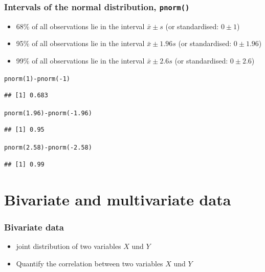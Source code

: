\documentclass[extsize,handout,10pt]{beamer}\usepackage[]{graphicx}\usepackage[]{color}
\makeatletter
\newcommand{\hlnum}[1]{\textcolor[rgb]{0.502,0.086,1}{#1}}%
\newcommand{\hlopt}[1]{\textcolor[rgb]{0.251,0.251,0.251}{#1}}%
\newcommand{\hlstd}[1]{\textcolor[rgb]{0.251,0.251,0.251}{#1}}%
\newcommand{\hlkwd}[1]{\textcolor[rgb]{0.69,0.188,0.941}{#1}}%
\newenvironment{kframe}{%
 \def\at@end@of@kframe{}%
 \ifinner\ifhmode%
  \def\at@end@of@kframe{\end{minipage}}%
  \begin{minipage}{\columnwidth}%
 \fi\fi%
 \def\FrameCommand##1{\hskip\@totalleftmargin \hskip-\fboxsep
 \colorbox{shadecolor}{##1}\hskip-\fboxsep
     \hskip-\linewidth \hskip-\@totalleftmargin \hskip\columnwidth}%
 \MakeFramed {\advance\hsize-\width
   \@totalleftmargin\z@ \linewidth\hsize
   \@setminipage}}%
 {\par\unskip\endMakeFramed%
 \at@end@of@kframe}
\newenvironment{knitrout}{}{} %
\makeatother
\begin{document}
\scriptsize
  \begin{frame}[containsverbatim]
    \frametitle{Intervals of the normal distribution, \texttt{pnorm()}}
    \begin{itemize}
    \item<3-> \alert{68\%} of all observations lie in the interval
      \alert{$\bar{x}\pm{s}$} (or standardised: \alert{$0\pm{1}$})
    \item<3-> \alert{95\%} of all observations lie in the interval
      \alert{$\bar{x}\pm 1.96{s}$} (or standardised: \alert{$0\pm{1.96}$})
    \item<3-> \alert{99\%} of all observations lie in the interval
      \alert{$\bar{x}\pm 2.6{s}$} (or standardised: \alert{$0\pm{2.6}$})
    \end{itemize}

\begin{knitrout}\tiny
{}\color{fgcolor}\begin{kframe}
\begin{alltt}
\hlkwd{pnorm}\hlstd{(}\hlnum{1}\hlstd{)}\hlopt{-}\hlkwd{pnorm}\hlstd{(}\hlopt{-}\hlnum{1}\hlstd{)}
\end{alltt}
\begin{verbatim}
## [1] 0.683
\end{verbatim}
\begin{alltt}
\hlkwd{pnorm}\hlstd{(}\hlnum{1.96}\hlstd{)}\hlopt{-}\hlkwd{pnorm}\hlstd{(}\hlopt{-}\hlnum{1.96}\hlstd{)}
\end{alltt}
\begin{verbatim}
## [1] 0.95
\end{verbatim}
\begin{alltt}
\hlkwd{pnorm}\hlstd{(}\hlnum{2.58}\hlstd{)}\hlopt{-}\hlkwd{pnorm}\hlstd{(}\hlopt{-}\hlnum{2.58}\hlstd{)}
\end{alltt}
\begin{verbatim}
## [1] 0.99
\end{verbatim}
\end{kframe}
\end{knitrout}
            
  \end{frame}
\normalsize

\section{Bivariate and multivariate data}


\begin{frame}
  \frametitle{Bivariate data}
  \begin{itemize}
  \item  \alert{joint distribution} of two variables $X$ und
    $Y$
  \item Quantify the \alert{correlation} between two variables $X$ und $Y$
  \end{itemize}
\end{frame}
\end{document}
